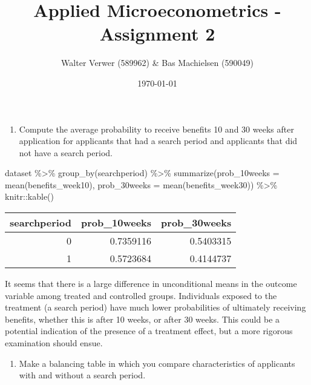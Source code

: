 \documentclass[
]{article}
\title{Applied Microeconometrics - Assignment 2}
\author{Walter Verwer (589962) \& Bas Machielsen (590049)}
\date{\today}
\newenvironment{Shaded}{\begin{snugshade}}{\end{snugshade}}
\newcommand{\AttributeTok}[1]{\textcolor[rgb]{0.77,0.63,0.00}{#1}}
\newcommand{\FunctionTok}[1]{\textcolor[rgb]{0.00,0.00,0.00}{#1}}
\newcommand{\NormalTok}[1]{#1}
\newcommand{\SpecialCharTok}[1]{\textcolor[rgb]{0.00,0.00,0.00}{#1}}
\providecommand{\tightlist}{%
  \setlength{\itemsep}{0pt}\setlength{\parskip}{0pt}}
\let\oldShaded\Shaded
\let\endoldShaded\endShaded
\renewenvironment{Shaded}{\footnotesize\oldShaded}{\endoldShaded}
\begin{document}
\maketitle

\begin{enumerate}
\def\labelenumi{\arabic{enumi}.}
\tightlist
\item
  Compute the average probability to receive benefits 10 and 30 weeks
  after application for applicants that had a search period and
  applicants that did not have a search period.
\end{enumerate}

\begin{Shaded}
\begin{Highlighting}[]
\NormalTok{dataset }\SpecialCharTok{\%\textgreater{}\%}
    \FunctionTok{group\_by}\NormalTok{(searchperiod) }\SpecialCharTok{\%\textgreater{}\%}
    \FunctionTok{summarize}\NormalTok{(}\AttributeTok{prob\_10weeks =} \FunctionTok{mean}\NormalTok{(benefits\_week10), }\AttributeTok{prob\_30weeks =} \FunctionTok{mean}\NormalTok{(benefits\_week30)) }\SpecialCharTok{\%\textgreater{}\%}
\NormalTok{    knitr}\SpecialCharTok{::}\FunctionTok{kable}\NormalTok{()}
\end{Highlighting}
\end{Shaded}

\begin{longtable}[]{@{}rrr@{}}
\toprule
searchperiod & prob\_10weeks & prob\_30weeks\tabularnewline
\midrule
\endhead
0 & 0.7359116 & 0.5403315\tabularnewline
1 & 0.5723684 & 0.4144737\tabularnewline
\bottomrule
\end{longtable}

It seems that there is a large difference in unconditional means in the
outcome variable among treated and controlled groups. Individuals
exposed to the treatment (a search period) have much lower probabilities
of ultimately receiving benefits, whether this is after 10 weeks, or
after 30 weeks. This could be a potential indication of the presence of
a treatment effect, but a more rigorous examination should ensue.

\begin{enumerate}
\def\labelenumi{\arabic{enumi}.}
\setcounter{enumi}{1}
\tightlist
\item
  Make a balancing table in which you compare characteristics of
  applicants with and without a search period.
\end{enumerate}
\end{document}
